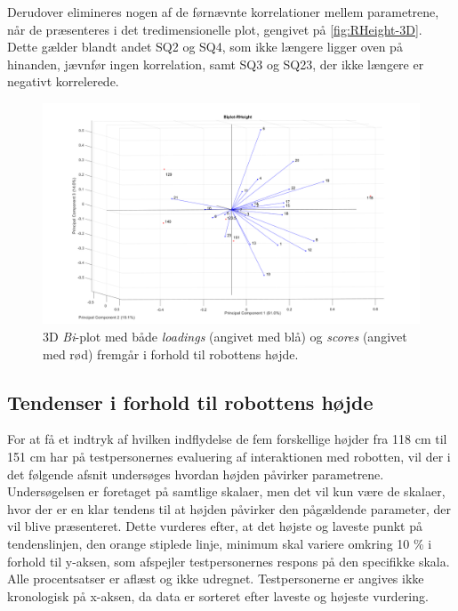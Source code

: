 Derudover elimineres nogen af de førnævnte korrelationer mellem parametrene, når de præsenteres i det tredimensionelle plot, gengivet på \autoref{fig:RHeight-3D}. Dette gælder blandt andet SQ2 og SQ4, som ikke længere ligger oven på hinanden, jævnfør ingen korrelation, samt SQ3 og SQ23, der ikke længere er negativt korrelerede.   
\begin{figure}[H]
\centering
\includegraphics[width=\textwidth]{Figure/DatabehandlingSkalaer/PCAfigures/RHeight-3D.png}
\caption{3D \textit{Bi}-plot med både \textit{loadings} (angivet med blå) og \textit{scores} (angivet med rød) fremgår i forhold til robottens højde.}
\label{fig:RHeight-3D}
\end{figure}
%

\subsection{Tendenser i forhold til robottens højde}
\label{DatabehandlingRHeightTendenser}
%
For at få et indtryk af hvilken indflydelse de fem forskellige højder fra 118 cm til 151 cm har på testpersonernes evaluering af interaktionen med robotten, vil der i det følgende afsnit undersøges hvordan højden påvirker parametrene. Undersøgelsen er foretaget på samtlige skalaer, men det vil kun være de skalaer, hvor der er en klar tendens til at højden påvirker den pågældende parameter, der vil blive præsenteret. Dette vurderes efter, at det højste og laveste punkt på tendenslinjen, den orange stiplede linje, minimum skal variere omkring 10 \% i forhold til y-aksen, som afspejler testpersonernes respons på den specifikke skala. Alle procentsatser er aflæst og ikke udregnet. Testpersonerne er angives ikke kronologisk på x-aksen, da data er sorteret efter laveste og højeste vurdering. 

